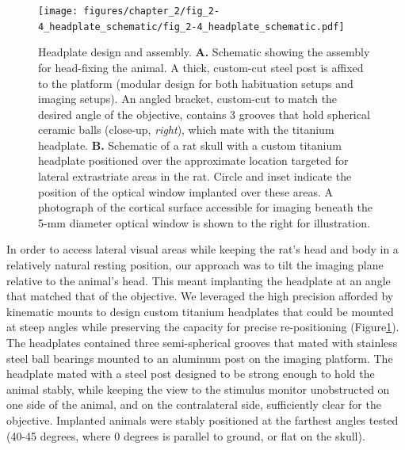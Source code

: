\begin{figure}
    \texttt{[image: figures/chapter\_2/fig\_2-4\_headplate\_schematic/fig\_2-4\_headplate\_schematic.pdf]}
    \vspace{.1in}
    \caption[Headplate design and assembly]{Headplate design and assembly. \textbf{A.} Schematic showing the assembly for head-fixing the animal. A thick, custom-cut steel post is affixed to the platform (modular design for both habituation setups and imaging setups). An angled bracket, custom-cut to match the desired angle of the objective, contains 3 grooves that hold spherical ceramic balls (close-up, \textit{right}), which mate with the titanium headplate. \textbf{B.} Schematic of a rat skull with a custom titanium headplate positioned over the approximate location targeted for lateral extrastriate areas in the rat. Circle and inset indicate the position of the optical window implanted over these areas. A photograph of the cortical surface accessible for imaging beneath the 5-mm diameter optical window is shown to the right for illustration. 
    \label{fig:headplate_schematic}}
\end{figure}

In order to access lateral visual areas while keeping the rat’s head and body in a relatively natural resting position, our approach was to tilt the imaging plane relative to the animal’s head. This meant implanting the headplate at an angle that matched that of the objective. We leveraged the high precision afforded by kinematic mounts to design custom titanium headplates that could be mounted at steep angles while preserving the capacity for precise re-positioning (Figure\ref{fig:headplate_schematic}). The headplates contained three semi-spherical grooves that mated with stainless steel ball bearings mounted to an aluminum post on the imaging platform. The headplate mated with a steel post designed to be strong enough to hold the animal stably, while keeping the view to the stimulus monitor unobstructed on one side of the animal, and on the contralateral side, sufficiently clear for the objective. Implanted animals were stably positioned at the farthest angles tested (40-45 degrees, where 0 degrees is parallel to ground, or flat on the skull).  

